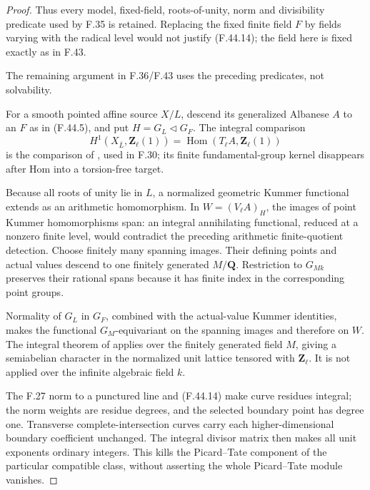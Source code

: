 \begin{proof}
Thus every model, fixed-field, roots-of-unity, norm and divisibility predicate used by F.35 is retained. Replacing the fixed finite field \(F\) by fields varying with the radical level would not justify \textup{(F.44.14)}; the field here is fixed exactly as in F.43.


The remaining argument in F.36/F.43 uses the preceding predicates, not solvability.

For a smooth pointed affine source \(X/L\), descend its generalized Albanese \(A\) to an \(F\) as in \textup{(F.44.5)}, and put \(H=G_L\triangleleft G_F\). The integral comparison
\[
 H^1(X_{\bar L},\mathbf Z_\ell(1))
       =\operatorname{Hom}(T_\ell A,\mathbf Z_\ell(1))
\]
is the comparison of \citet[Propositions~4.1,~4.3 and Corollary~4.2]{F_SpiessSzamuely2003}, used in F.30; its finite fundamental-group kernel disappears after Hom into a torsion-free target.

Because all roots of unity lie in \(L\), a normalized geometric Kummer functional extends as an arithmetic homomorphism. In \(W=(V_\ell A)_H\), the images of point Kummer homomorphisms span: an integral annihilating functional, reduced at a nonzero finite level, would contradict the preceding arithmetic finite-quotient detection. Choose finitely many spanning images. Their defining points and actual values descend to one finitely generated \(M/\mathbf Q\). Restriction to \(G_{Mk}\) preserves their rational spans because it has finite index in the corresponding point groups.

Normality of \(G_L\) in \(G_F\), combined with the actual-value Kummer identities, makes the functional \(G_M\)-equivariant on the spanning images and therefore on \(W\). The integral theorem of \citet[Theorem~4.3(ii), p.~676]{F_Jannsen1995} applies over the finitely generated field \(M\), giving a semiabelian character in the normalized unit lattice tensored with \(\mathbf Z_\ell\). It is not applied over the infinite algebraic field \(k\).

The F.27 norm to a punctured line and \textup{(F.44.14)} make curve residues integral; the norm weights are residue degrees, and the selected boundary point has degree one. Transverse complete-intersection curves carry each higher-dimensional boundary coefficient unchanged. The integral divisor matrix then makes all unit exponents ordinary integers. This kills the Picard–Tate component of the particular compatible class, without asserting the whole Picard–Tate module vanishes.


\end{proof}
